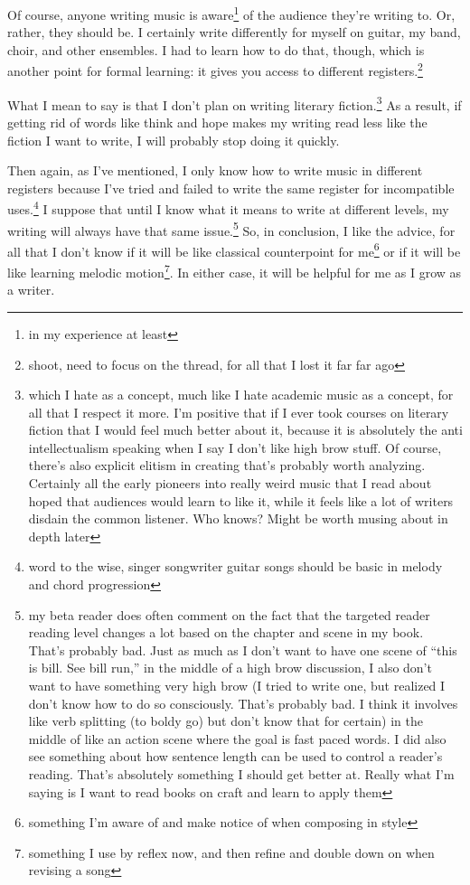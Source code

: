 \documentclass[12pt]{article}[titlepage]
\newcommand{\say}[1]{``#1''}
\newcommand{\1}{\={a}}
\newcommand{\2}{\={e}}
\newcommand{\3}{\={\i}}
\newcommand{\4}{\=o}
\newcommand{\5}{\=u}
\newcommand{\6}{\={A}}
\renewcommand{\,}{\textsuperscript{,}}
\begin{document}
Of course, anyone writing music is aware\footnote{in my experience at least} of the audience they're writing to.
Or, rather, they should be.
I certainly write differently for myself on guitar, my band, choir, and other ensembles.
I had to learn how to do that, though, which is another point for formal learning: it gives you access to different registers.\footnote{shoot, need to focus on the thread, for all that I lost it far far ago}

What I mean to say is that I don't plan on writing literary fiction.\footnote{which I hate as a concept, much like I hate academic music as a concept, for all that I respect it more.
I'm positive that if I ever took courses on literary fiction that I would feel much better about it, because it is absolutely the anti intellectualism speaking when I say I don't like high brow stuff.
Of course, there's also explicit elitism in creating that's probably worth analyzing.
Certainly all the early pioneers into really weird music that I read about hoped that audiences would learn to like it, while it feels like a lot of writers disdain the common listener.
Who knows?
Might be worth musing about in depth later}
As a result, if getting rid of words like think and hope makes my writing read less like the fiction I want to write, I will probably stop doing it quickly.

Then again, as I've mentioned, I only know how to write music in different registers because I've tried and failed to write the same register for incompatible uses.\footnote{word to the wise, singer songwriter guitar songs should be basic in melody and chord progression}
I suppose that until I know what it means to write at different levels, my writing will always have that same issue.\footnote{my beta reader does often comment on the fact that the targeted reader reading level changes a lot based on the chapter and scene in my book.
That's probably bad.
Just as much as I don't want to have one scene of \say{this is bill.
See bill run,} in the middle of a high brow discussion, I also don't want to have something very high brow (I tried to write one, but realized I don't know how to do so consciously.
That's probably bad.
I think it involves like verb splitting (to boldy go) but don't know that for certain) in the middle of like an action scene where the goal is fast paced words.
I did also see something about how sentence length can be used to control a reader's reading.
That's absolutely something I should get better at.
Really what I'm saying is I want to read books on craft and learn to apply them}
So, in conclusion, I like the advice, for all that I don't know if it will be like classical counterpoint for me\footnote{something I'm aware of and make notice of when composing in style} or if it will be like learning melodic motion\footnote{something I use by reflex now, and then refine and double down on when revising a song}.
In either case, it will be helpful for me as I grow as a writer.
\end{document}
